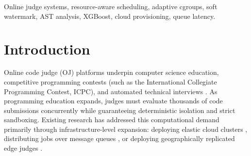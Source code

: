 \documentclass[conference]{IEEEtran}
\begin{document}
\begin{abstract}
The live 80-run matrix shows that tier selection carries no measurable CPU cost (4.2\% spread across strategies) and that live promotion fired in 8 of 8 eligible cases, in 259--817~ms depending on the language runtime, with every promoted submission still correct. It also exposes a limitation we report rather than conceal: the predictive classifier alone routed all four heavy-workload languages to the light tier and never promoted, with the JVM clearing the hard limit by only 24.3~MB. Prediction reduces how often a submission is constrained; the kernel watermark is what keeps the constrained ones correct.

Seeded with our measured profiles, the 10,000-submission simulation shows RAAS-OCJS reclaiming 10,316.25~GB of RAM (a 51.58\% reduction) and cutting CPU core-hours by 20.26\% relative to the static baseline. In the simulated 500-submission freeze rush, adaptive tiering eliminates queue wait time (14,590.1~ms down to 0.0~ms) and cuts P95 turnaround latency by 21.4$\times$ (1,320.2~ms vs. 28,238.5~ms). The cloud cost projection, built on these same profiles, works out to a 16.0$\times$ reduction in base pod memory and an 88.9\% reduction in required VM instances, worth USD~21.76 per hour at \texttt{c6i.4xlarge} pricing, under the assumptions stated in Section~V. We also report a measured boundary test at a 128~MiB tier limit that isolates the JVM's tier-sizing requirement, and outline directions for future, language-aware tier sizing.
\end{abstract}

\begin{IEEEkeywords}
Online judge systems, resource-aware scheduling, adaptive cgroups, soft watermark, AST analysis, XGBoost, cloud provisioning, queue latency.
\end{IEEEkeywords}

\section{Introduction}
Online code judge (OJ) platforms underpin computer science education, competitive programming contests (such as the International Collegiate Programming Contest, ICPC), and automated technical interviews \cite{wasik2018survey}. As programming education expands, judges must evaluate thousands of code submissions concurrently while guaranteeing deterministic isolation and strict sandboxing. Existing research has addressed this computational demand primarily through infrastructure-level expansion: deploying elastic cloud clusters \cite{pan2022cloud}, distributing jobs over message queues \cite{song2025idl}, or deploying geographically replicated edge judges \cite{wang2021metaoj}.
\end{document}
